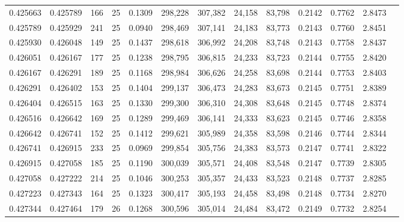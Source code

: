 \begin{tabular}{rrrrrrrrrrrrr}
0.425663 & 0.425789 &   166 &  25 &                                     0.1309 & 298,228 & 307,382 &  24,158 &  83,798 & 0.2142 & 0.7762 & 2.8473 \\
0.425789 & 0.425929 &   241 &  25 &                                     0.0940 & 298,469 & 307,141 &  24,183 &  83,773 & 0.2143 & 0.7760 & 2.8451 \\
0.425930 & 0.426048 &   149 &  25 &                                     0.1437 & 298,618 & 306,992 &  24,208 &  83,748 & 0.2143 & 0.7758 & 2.8437 \\
0.426051 & 0.426167 &   177 &  25 &                                     0.1238 & 298,795 & 306,815 &  24,233 &  83,723 & 0.2144 & 0.7755 & 2.8420 \\
0.426167 & 0.426291 &   189 &  25 &                                     0.1168 & 298,984 & 306,626 &  24,258 &  83,698 & 0.2144 & 0.7753 & 2.8403 \\
0.426291 & 0.426402 &   153 &  25 &                                     0.1404 & 299,137 & 306,473 &  24,283 &  83,673 & 0.2145 & 0.7751 & 2.8389 \\
0.426404 & 0.426515 &   163 &  25 &                                     0.1330 & 299,300 & 306,310 &  24,308 &  83,648 & 0.2145 & 0.7748 & 2.8374 \\
0.426516 & 0.426642 &   169 &  25 &                                     0.1289 & 299,469 & 306,141 &  24,333 &  83,623 & 0.2145 & 0.7746 & 2.8358 \\
0.426642 & 0.426741 &   152 &  25 &                                     0.1412 & 299,621 & 305,989 &  24,358 &  83,598 & 0.2146 & 0.7744 & 2.8344 \\
0.426741 & 0.426915 &   233 &  25 &                                     0.0969 & 299,854 & 305,756 &  24,383 &  83,573 & 0.2147 & 0.7741 & 2.8322 \\
0.426915 & 0.427058 &   185 &  25 &                                     0.1190 & 300,039 & 305,571 &  24,408 &  83,548 & 0.2147 & 0.7739 & 2.8305 \\
0.427058 & 0.427222 &   214 &  25 &                                     0.1046 & 300,253 & 305,357 &  24,433 &  83,523 & 0.2148 & 0.7737 & 2.8285 \\
0.427223 & 0.427343 &   164 &  25 &                                     0.1323 & 300,417 & 305,193 &  24,458 &  83,498 & 0.2148 & 0.7734 & 2.8270 \\
0.427344 & 0.427464 &   179 &  26 &                                     0.1268 & 300,596 & 305,014 &  24,484 &  83,472 & 0.2149 & 0.7732 & 2.8254 \\

\end{tabular}
